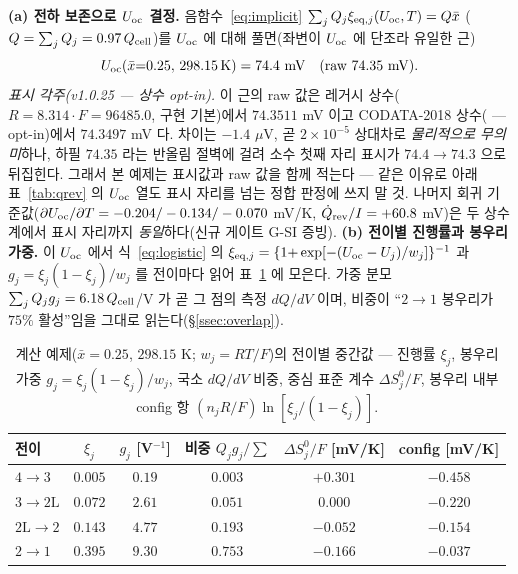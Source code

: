 \textbf{(a) 전하 보존으로 $U_{\mathrm{oc}}$ 결정.} 음함수~\eqref{eq:implicit} $\sum_jQ_j\xi_{\mathrm{eq},j}(U_{\mathrm{oc}},T)=Q\bar x$
($Q=\sum_jQ_j=0.97\,Q_{\mathrm{cell}}$)를 $U_{\mathrm{oc}}$ 에 대해 풀면(좌변이 $U_{\mathrm{oc}}$ 에 단조라 유일한 근)
\begin{equation*}
U_\oc(\bar x{=}0.25,\,298.15\,\mathrm K)=74.4\ \mathrm{mV}\quad(\text{raw }74.35\ \mathrm{mV}).
\end{equation*}
\emph{표시 각주(v1.0.25 --- 상수 opt-in).} 이 근의 raw 값은 레거시 상수($R{=}8.314\cdot F{=}96485.0$, 구현
기본)에서 $74.3511$ mV 이고 CODATA-2018 상수( --- opt-in)에서 $74.3497$ mV 다.
차이는 $-1.4$ $\mu$V, 곧 $2\times10^{-5}$ 상대차로 \emph{물리적으로 무의미}하나, 하필 $74.35$ 라는 반올림
절벽에 걸려 소수 첫째 자리 표시가 $74.4\to74.3$ 으로 뒤집힌다. 그래서 본 예제는 표시값과 raw 값을 함께 적는다
--- 같은 이유로 아래 표~\ref{tab:qrev} 의 $U_{\mathrm{oc}}$ 열도 표시 자리를 넘는 정합 판정에 쓰지 말 것. 나머지 회귀
기준값($\partial U_{\mathrm{oc}}/\partial T=-0.204/-0.134/-0.070$ mV/K, $\dot Q_{\mathrm{rev}}/I=+60.8$ mV)은 두 상수계에서
표시 자리까지 \emph{동일}하다(신규 게이트 G-SI 증빙).
\textbf{(b) 전이별 진행률과 봉우리 가중.} 이 $U_{\mathrm{oc}}$ 에서 식~\eqref{eq:logistic} 의
$\xi_{\mathrm{eq},j}=\{1{+}\exp[-(U_{\mathrm{oc}}-U_j)/w_j]\}^{-1}$ 과 $g_j=\xi_j(1-\xi_j)/w_j$ 를 전이마다 읽어 표~\ref{tab:worked}
에 모은다. 가중 분모 $\sum_jQ_jg_j=6.18\,Q_{\mathrm{cell}}$/V 가 곧 그 점의 측정 $dQ/dV$ 이며, 비중이 ``$2\!\to\!1$
봉우리가 $75\%$ 활성''임을 그대로 읽는다(\S\ref{ssec:overlap}).

\begin{table}[htbp]
\centering\small
\renewcommand{\arraystretch}{1.2}
\caption{계산 예제($\bar x{=}0.25$, $298.15$ K; $w_j{=}RT/F$)의 전이별 중간값 --- 진행률 $\xi_j$, 봉우리 가중
$g_j=\xi_j(1-\xi_j)/w_j$, 국소 $dQ/dV$ 비중, 중심 표준 계수 $\Delta S^0_j/F$, 봉우리 내부 config 항
$(n_jR/F)\ln[\xi_j/(1-\xi_j)]$.}
\label{tab:worked}
\begin{tabular}{lccccc}
\toprule
전이 & $\xi_j$ & $g_j$ [V$^{-1}$] & 비중 $Q_jg_j/\!\sum$ & $\Delta S^0_j/F$ [mV/K] & config [mV/K] \\
\midrule
$4\!\to\!3$   & $0.005$ & $0.19$ & $0.003$ & $+0.301$ & $-0.458$ \\
$3\!\to\!2\mathrm L$ & $0.072$ & $2.61$ & $0.051$ & $0.000$ & $-0.220$ \\
$2\mathrm L\!\to\!2$ & $0.143$ & $4.77$ & $0.193$ & $-0.052$ & $-0.154$ \\
$2\!\to\!1$   & $0.395$ & $9.30$ & $0.753$ & $-0.166$ & $-0.037$ \\
\bottomrule
\end{tabular}
\end{table}

